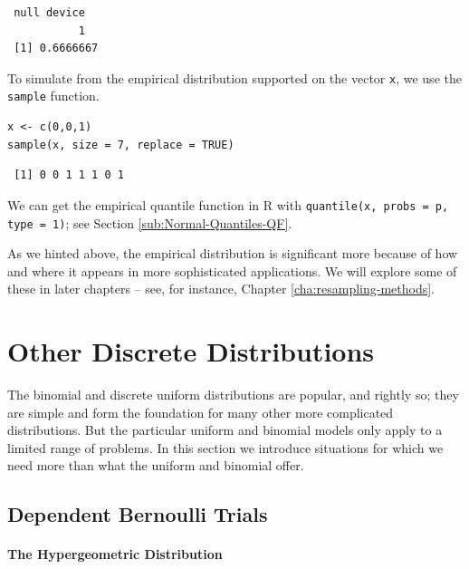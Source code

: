 \documentclass[captions=tableheading]{scrbook}
\begin{document}
\begin{verbatim}
 null device 
           1
 [1] 0.6666667
\end{verbatim}

To simulate from the empirical distribution supported on the vector \texttt{x}, we use the \texttt{sample} function.


\begin{verbatim}
x <- c(0,0,1)
sample(x, size = 7, replace = TRUE)
\end{verbatim}

\begin{verbatim}
 [1] 0 0 1 1 1 0 1
\end{verbatim}

We can get the empirical quantile function in \textsf{R} with \texttt{quantile(x, probs = p, type = 1)}; see Section \ref{sub:Normal-Quantiles-QF}.

As we hinted above, the empirical distribution is significant more because of how and where it appears in more sophisticated applications. We will explore some of these in later chapters -- see, for instance, Chapter \ref{cha:resampling-methods}.
\section{Other Discrete Distributions}
\label{sec-5-6}

\label{sec:other-discrete-distributions}

The binomial and discrete uniform distributions are popular, and rightly so; they are simple and form the foundation for many other more complicated distributions. But the particular uniform and binomial models only apply to a limited range of problems. In this section we introduce situations for which we need more than what the uniform and binomial offer.
\subsection{Dependent Bernoulli Trials}
\label{sec-5-6-1}

\label{sec:non-bernoulli-trials}

\paragraph*{The Hypergeometric Distribution}
\label{sub:hypergeometric-dist}
\end{document}
